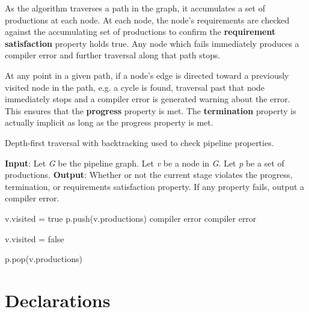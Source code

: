 As the algorithm traverses a path in the graph, it accumulates a set of productions at each node. At each node, the node's requirements are checked against the accumulating set of productions to confirm the \textbf{requirement satisfaction} property holds true. Any node which fails immediately produces a compiler error and further traversal along that path stops.

At any point in a given path, if a node's edge is directed toward a previously visited node in the path, e.g. a cycle is found, traversal past that node immediately stops and a compiler error is generated warning about the error. This ensures that the \textbf{progress} property is met. The \textbf{termination} property is actually implicit as long as the progress property is met.

\begin{algorithm}
 \caption{Depth-first traversal with backtracking used to check pipeline properties.}
 \label{alg:dfs}
 \begin{algorithmic}
 \State
 \State \textbf{Input}: Let \textit{G} be the pipeline graph. Let \textit{v} be a node in \textit{G}. Let \textit{p} be a set of productions.
 \State \textbf{Output}: Whether or not the current stage violates the progress, termination, or requirements satisfaction property. If any property fails, output a compiler error.
 \State

 	\State v.visited = true
 	\State p.push(v.productions)
 				\State {}
 			\Else
 				\State \Return compiler error
 			\EndIf
 		\EndFor
	\Else
 		\State \Return compiler error
 	\EndIf

 	\State v.visited = false 

 	\State p.pop(v.productions) 
 \EndFunction
 \end{algorithmic}

\end{algorithm}

\section{Declarations} \label{declaration_guide}

